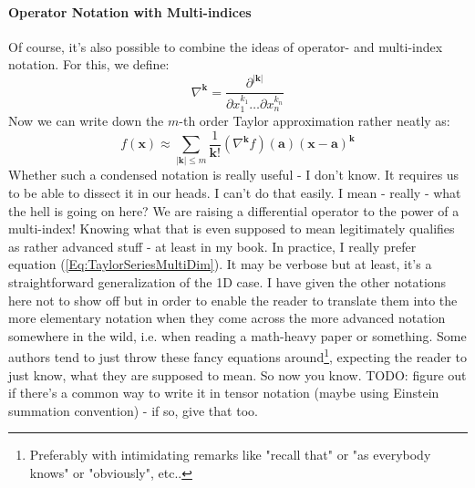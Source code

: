 \paragraph{Operator Notation with Multi-indices}
Of course, it's also possible to combine the ideas of operator- and multi-index notation. For this, we define:
\begin{equation}
\nabla ^ {\mathbf{k}} = \frac{\partial^{|\mathbf{k}|}}{\partial x_1^{k_1} \ldots \partial x_n^{k_n}}
\end{equation}
Now we can write down the $m$-th order Taylor approximation rather neatly as:
\begin{equation}
f(\mathbf{x}) \approx \sum_{|\mathbf{k}| \leq m} \frac{1}{\mathbf{k}!} 
                      (\nabla ^ {\mathbf{k}} f)(\mathbf{a})  (\mathbf{x - a})^{\mathbf{k}}
\end{equation}
Whether such a condensed notation is really useful - I don't know. It requires us to be able to dissect it in our heads. I can't do that easily. I mean - really - what the hell is going on here? We are raising a differential operator to the power of a multi-index! Knowing what that is even supposed to mean legitimately qualifies as rather advanced stuff - at least in my book. In practice, I really prefer equation (\ref{Eq:TaylorSeriesMultiDim}). It may be verbose but at least, it's a straightforward generalization of the 1D case. I have given the other notations here not to show off but in order to enable the reader to translate them into the more elementary notation when they come across the more advanced notation somewhere in the wild, i.e. when reading a math-heavy paper or something. Some authors tend to just throw these fancy equations around\footnote{Preferably with intimidating remarks like "recall that" or "as everybody knows" or "obviously", etc..}, expecting the reader to just know, what they are supposed to mean. So now you know. TODO: figure out if there's a common way to write it in tensor notation (maybe using Einstein summation convention) - if so, give that too. %





